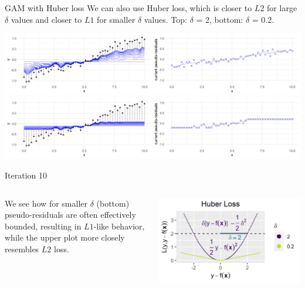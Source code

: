 \begin{frame}{GAM with Huber loss}
We can also use Huber loss, which is closer to $L2$ for large $\delta$ values 
and closer to $L1$ for 
smaller $\delta$ values. Top: $\delta$ = 2, bottom: $\delta$ = 0.2.

\vfill

\includegraphics[width=\textwidth]{figure/illustration_gaussian_huber_2_10.png}
\includegraphics[width=\textwidth]{figure/illustration_gaussian_huber_02_10.png}

\vfill

Iteration 10


\footnotesize
\begin{columns}[c]
\begin{column}{0.75\textwidth}
We see how for smaller $\delta$ (bottom) pseudo-residuals are often effectively
bounded, resulting in $L1$-like behavior, while the upper plot more closely 
resembles $L2$ loss.
\end{column}
\begin{column}{0.24\textwidth}
\includegraphics[width=1.2\textwidth]{figure/fig-loss-huber-delta.png}
\end{column}
\end{columns}

\end{frame}

